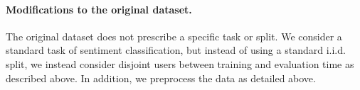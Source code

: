 \paragraph{Modifications to the original dataset.}
The original dataset does not prescribe a specific task or split.
We consider a standard task of sentiment classification, but instead of using a standard i.i.d. split, we instead consider disjoint users between training and evaluation time as described above.
In addition, we preprocess the data as detailed above.
